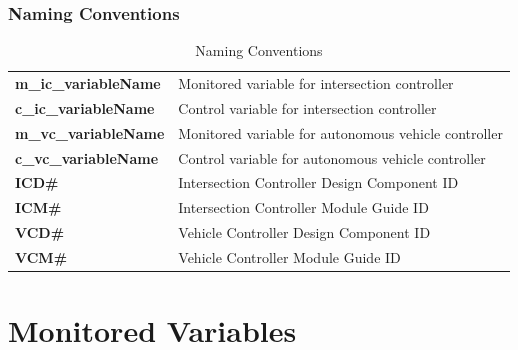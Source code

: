 \documentclass [10pt]{article}
\begin{document}
\subsubsection{Naming Conventions}
\begin{longtable}{ |p{ } p{ }|} \caption{Naming Conventions} \\ \hline

\textbf{m\_ic\_variableName} & Monitored variable for intersection controller \\ 

\cellcolor{tableCell}\textbf{c\_ic\_variableName}  & \cellcolor{tableCell}Control variable for intersection controller \\ 

\textbf{m\_vc\_variableName} & Monitored variable for autonomous vehicle controller \\ 

\cellcolor{tableCell}\textbf{c\_vc\_variableName}  & \cellcolor{tableCell}Control variable for autonomous vehicle controller \\ 

\textbf{ICD\#} & Intersection Controller Design Component ID \\ 

\cellcolor{tableCell}\textbf{ICM\#}  & \cellcolor{tableCell}Intersection Controller Module Guide ID \\

\textbf{VCD\#} & Vehicle Controller Design Component ID\\

\cellcolor{tableCell}\textbf{VCM\#}  & \cellcolor{tableCell}Vehicle Controller Module Guide ID \\\hline



\end{longtable}


%




\section{Monitored Variables}
\end{document}
